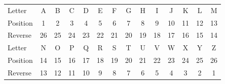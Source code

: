 \begin{center}
\small
\setlength{\tabcolsep}{3.2pt}
\begin{tabular}{l*{13}{c}}
\toprule
Letter & A & B & C & D & E & F & G & H & I & J & K & L & M \\
Position & 1 & 2 & 3 & 4 & 5 & 6 & 7 & 8 & 9 & 10 & 11 & 12 & 13 \\
Reverse & 26 & 25 & 24 & 23 & 22 & 21 & 20 & 19 & 18 & 17 & 16 & 15 & 14 \\
\midrule
Letter & N & O & P & Q & R & S & T & U & V & W & X & Y & Z \\
Position & 14 & 15 & 16 & 17 & 18 & 19 & 20 & 21 & 22 & 23 & 24 & 25 & 26 \\
Reverse & 13 & 12 & 11 & 10 & 9 & 8 & 7 & 6 & 5 & 4 & 3 & 2 & 1 \\
\bottomrule
\end{tabular}
\end{center}
